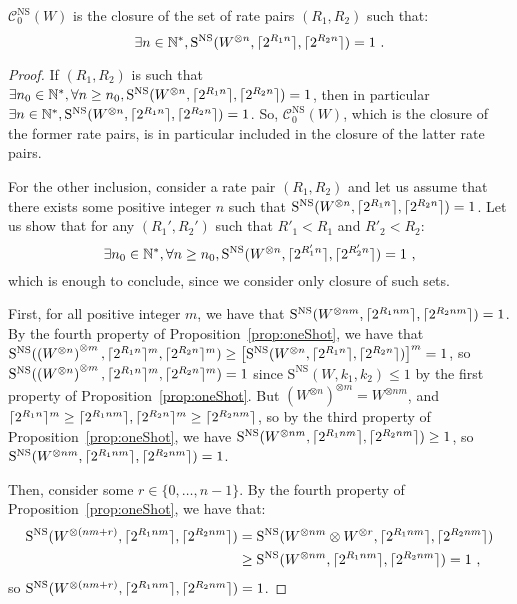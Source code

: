 \begin{proposition}
  \label{prop:ZENScapacity}
   $\mathcal{C}^{\mathrm{NS}}_0(W)$ is the closure of the set of rate pairs $(R_1,R_2)$ such that:
  \[ \exists n \in \mathbb{N}^*, \mathrm{S}^{\mathrm{NS}}(W^{\otimes n},\lceil2^{R_1n}\rceil,\lceil2^{R_2n}\rceil) = 1 \ . \]
\end{proposition}
\begin{proof}
  If $(R_1,R_2)$ is such that $\exists n_0 \in \mathbb{N}^*, \forall n \geq n_0, \mathrm{S}^{\mathrm{NS}}(W^{\otimes n},\lceil2^{R_1n}\rceil,\lceil2^{R_2n}\rceil) = 1$, then in particular $\exists n \in \mathbb{N}^*, \mathrm{S}^{\mathrm{NS}}(W^{\otimes n},\lceil2^{R_1n}\rceil,\lceil2^{R_2n}\rceil) = 1$. So, $\mathcal{C}^{\mathrm{NS}}_0(W)$, which is the closure of the former rate pairs, is in particular included in the closure of the latter rate pairs.
  
  For the other inclusion, consider a rate pair $(R_1,R_2)$ and let us assume that there exists some positive integer $n$ such that $\mathrm{S}^{\mathrm{NS}}(W^{\otimes n},\lceil2^{R_1n}\rceil,\lceil2^{R_2n}\rceil) = 1$. Let us show that for any $(R_1',R_2')$ such that $R'_1 < R_1$ and $R'_2 < R_2$:
  \[ \exists n_0 \in \mathbb{N}^*, \forall n \geq n_0, \mathrm{S}^{\mathrm{NS}}(W^{\otimes n},\lceil2^{R_1'n}\rceil,\lceil2^{R_2'n}\rceil) = 1 \ , \]
  which is enough to conclude, since we consider only closure of such sets.
  
  First, for all positive integer $m$, we have that $\mathrm{S}^{\mathrm{NS}}(W^{\otimes nm},\lceil2^{R_1nm}\rceil,\lceil2^{R_2nm}\rceil) = 1$. By the fourth property of Proposition~\ref{prop:oneShot}, we have that $\mathrm{S}^{\mathrm{NS}}(\left(W^{\otimes n}\right)^{\otimes m},\lceil2^{R_1n}\rceil^m,\lceil2^{R_2n}\rceil^m) \geq \left[\mathrm{S}^{\mathrm{NS}}(W^{\otimes n},\lceil2^{R_1n}\rceil,\lceil2^{R_2n}\rceil)\right]^m = 1$, so $\mathrm{S}^{\mathrm{NS}}(\left(W^{\otimes n}\right)^{\otimes m},\lceil2^{R_1n}\rceil^m,\lceil2^{R_2n}\rceil^m) = 1$ since $\mathrm{S}^{\mathrm{NS}}(W,k_1,k_2) \leq 1$ by the first property of Proposition~\ref{prop:oneShot}. But $\left(W^{\otimes n}\right)^{\otimes m} = W^{\otimes nm}$, and $\lceil2^{R_1n}\rceil^m \geq \lceil2^{R_1nm}\rceil,\lceil2^{R_2n}\rceil^m \geq \lceil2^{R_2nm}\rceil$, so by the third property of Proposition~\ref{prop:oneShot}, we have $\mathrm{S}^{\mathrm{NS}}(W^{\otimes nm},\lceil2^{R_1nm}\rceil,\lceil2^{R_2nm}\rceil) \geq 1$, so $\mathrm{S}^{\mathrm{NS}}(W^{\otimes nm},\lceil2^{R_1nm}\rceil,\lceil2^{R_2nm}\rceil)=1$.

  Then, consider some $r \in \{0,\ldots,n-1\}$. By the fourth property of Proposition~\ref{prop:oneShot}, we have that:
  \begin{equation}
    \begin{aligned}
      \mathrm{S}^{\mathrm{NS}}(W^{\otimes (nm+r)},\lceil2^{R_1nm}\rceil,\lceil2^{R_2nm}\rceil) &= \mathrm{S}^{\mathrm{NS}}(W^{\otimes nm} \otimes W^{\otimes r},\lceil2^{R_1nm}\rceil,\lceil2^{R_2nm}\rceil)\\
      &\geq \mathrm{S}^{\mathrm{NS}}(W^{\otimes nm},\lceil2^{R_1nm}\rceil,\lceil2^{R_2nm}\rceil) = 1 \ ,
    \end{aligned}
  \end{equation}
  so $\mathrm{S}^{\mathrm{NS}}(W^{\otimes (nm+r)},\lceil2^{R_1nm}\rceil,\lceil2^{R_2nm}\rceil) = 1$.


\end{proof}
